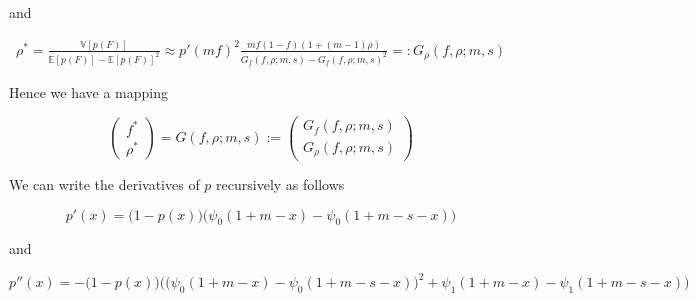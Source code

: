 \documentclass[american, abstract=on]{scrartcl}
\newcommand{\E}{\mathbb{E}}
\newcommand{\V}{\mathbb{V}}
\begin{document}
and

\begin{equation}
  \begin{split}
    \rho^* = \frac{\V[p(F)]}{\E[p(F)] - \E[p(F)]^2} \approx p'(m f)^2 \frac{m f (1 - f) (1 + (m - 1) \rho)}{ G_f(f, \rho; m, s) -  G_f(f, \rho; m, s)^2} =:  G_\rho(f, \rho; m, s)
  \end{split}
\end{equation}

Hence we have a mapping

\begin{equation}
  \begin{pmatrix}
    f^* \\ \rho^*
  \end{pmatrix} = G(f, \rho; m, s) := \begin{pmatrix}
    G_f(f, \rho; m, s) \\ G_\rho(f, \rho; m, s)
  \end{pmatrix}
\end{equation}

We can write the derivatives of $p$ recursively as follows

\begin{equation}
  p'(x) = \big(1 - p(x)\big) \Big( \psi_0(1 + m - x) - \psi_0(1 + m - s - x) \Big)
\end{equation}

and

\begin{equation}
  p''(x) = -\big(1 - p(x)\big)\Big( \big(\psi_0(1 + m - x) - \psi_0(1 + m - s - x)\big)^2 + \psi_1(1 + m - x) - \psi_1(1 + m - s - x) \Big)
\end{equation}
\end{document}
